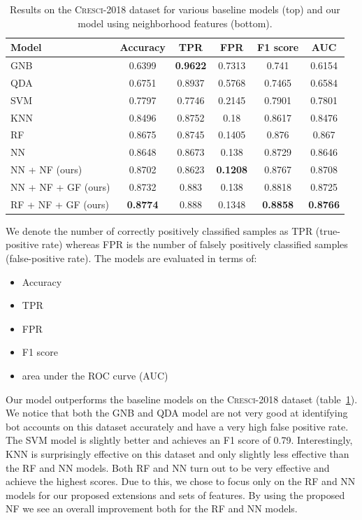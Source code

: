 \begin{table}[t]
\centering
\setlength{\tabcolsep}{12pt}
\begin{tabular}{@{}lccccc@{}}
\toprule
\textbf{Model} & \textbf{Accuracy} & \textbf{TPR} & \textbf{FPR} & \textbf{F1 score} & \textbf{AUC} \\ \midrule
GNB             & 0.6399 & \textbf{0.9622} & 0.7313 & 0.741  & 0.6154 \\
QDA             & 0.6751 & 0.8937 & 0.5768 & 0.7465 & 0.6584 \\
SVM             & 0.7797 & 0.7746 & 0.2145 & 0.7901 & 0.7801 \\
KNN             & 0.8496 & 0.8752 & 0.18   & 0.8617 & 0.8476 \\
RF              & 0.8675 & 0.8745 & 0.1405 & 0.876  & 0.867 \\
NN              & 0.8648 & 0.8673 & 0.138  & 0.8729 & 0.8646 \\ \midrule
NN + NF (ours)  & 0.8702 & 0.8623 & \textbf{0.1208} & 0.8767 & 0.8708 \\
NN + NF + GF (ours) & 0.8732 & 0.883 & 0.138 & 0.8818 & 0.8725 \\
RF + NF + GF (ours) & \textbf{0.8774} & 0.888 & 0.1348 & \textbf{0.8858} & \textbf{0.8766} \\
\bottomrule
\end{tabular}
\caption{Results on the \textsc{Cresci-2018} dataset for various baseline models (top) and our model using neighborhood features (bottom).}
\label{tab:results}
\end{table}

\noindent We denote the number of correctly positively classified samples as TPR (true-positive rate) whereas FPR is the number of falsely positively classified samples (false-positive rate). The models are evaluated in terms of:
\begin{itemize}
    \item[1.] Accuracy
    \item[2.] TPR
    \item[3.] FPR
    \item[4.] F1 score
    \item[5.] area under the ROC curve (AUC)
\end{itemize}

Our model outperforms the baseline models on the \textsc{Cresci-2018} dataset (table~\ref{tab:results}). We notice that both the GNB and QDA model are not very good at identifying bot accounts on this dataset accurately and have a very high false positive rate. The SVM model is slightly better and achieves an F1 score of 0.79. Interestingly, KNN is surprisingly effective on this dataset and only slightly less effective than the RF and NN models. Both RF and NN turn out to be very effective and achieve the highest scores. Due to this, we chose to focus only on the RF and NN models for our proposed extensions and sets of features. By using the proposed NF we see an overall improvement both for the RF and NN models.

